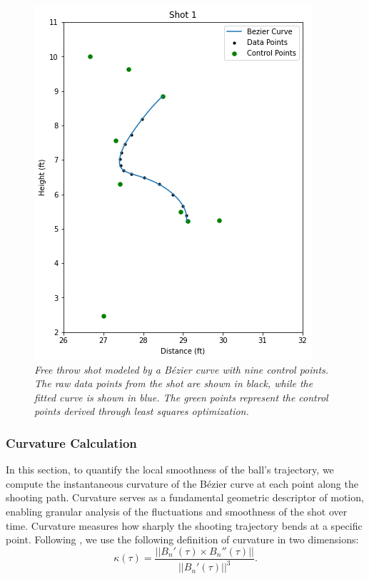 \documentclass{article}
\begin{document}
            \begin{figure}[H]
                \centering
                \includegraphics[scale=0.4]{shot1.png}
                \caption{\it Free throw shot modeled by a Bézier curve with nine control points. The raw data points from the shot are shown in black, while the fitted curve is shown in blue. The green points represent the control points derived through least squares optimization.}
                \label{fig:free-throw-bezier}
            \end{figure}

        \subsubsection{Curvature Calculation}

          In this section, to quantify the local smoothness of the ball’s trajectory, we compute the instantaneous curvature of the Bézier curve at each point along the shooting path. Curvature serves as a fundamental geometric descriptor of motion, enabling granular analysis of the fluctuations and smoothness of the shot over time. Curvature measures how sharply the shooting trajectory bends at a specific point. Following \citet{slegers_role_2024}, we use the following definition of curvature in two dimensions:
          \[
            \kappa(\tau) = \frac{||B_n'(\tau) \times B_n''(\tau)||}{||B_n'(\tau)||^3}.
          \]
          
\end{document}
